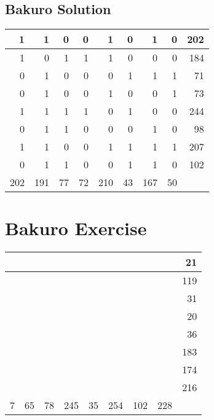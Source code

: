 \documentclass[]{article}
\begin{document}
 \subsection{Bakuro Solution} 
\begin{tabular}{rrrrrrrrr}
\hline
   1 &   1 &  0 &  0 &   1 &  0 &   1 &  0 & 202 \\ \hline
   1 &   0 &  1 &  1 &   1 &  0 &   0 &  0 & 184 \\ \hline
   0 &   1 &  0 &  0 &   0 &  1 &   1 &  1 &  71 \\ \hline
   0 &   1 &  0 &  0 &   1 &  0 &   0 &  1 &  73 \\ \hline
   1 &   1 &  1 &  1 &   0 &  1 &   0 &  0 & 244 \\ \hline
   0 &   1 &  1 &  0 &   0 &  0 &   1 &  0 &  98 \\ \hline
   1 &   1 &  0 &  0 &   1 &  1 &   1 &  1 & 207 \\ \hline
   0 &   1 &  1 &  0 &   0 &  1 &   1 &  0 & 102 \\ \hline
 202 & 191 & 77 & 72 & 210 & 43 & 167 & 50 &     \\ \hline
\hline
\end{tabular}\newpage\section{Bakuro Exercise}\begin{tabular}{rrrrrrrrr}
\hline
   &    &    &     &    &     &     &     &  21 \\ \hline
   &    &    &     &    &     &     &     & 119 \\ \hline
   &    &    &     &    &     &     &     &  31 \\ \hline
   &    &    &     &    &     &     &     &  20 \\ \hline
   &    &    &     &    &     &     &     &  36 \\ \hline
   &    &    &     &    &     &     &     & 183 \\ \hline
   &    &    &     &    &     &     &     & 174 \\ \hline
   &    &    &     &    &     &     &     & 216 \\ \hline
 7 & 65 & 78 & 245 & 35 & 254 & 102 & 228 &     \\ \hline
\hline
\end{tabular}\newpage 
\end{document}
